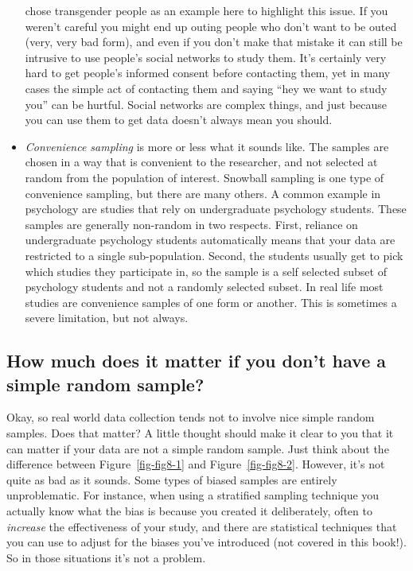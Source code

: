 \documentclass[
  a4paper,
]{book}
\begin{document}
\begin{itemize}
  chose transgender people as an example here to highlight this issue.
  If you weren't careful you might end up outing people who don't want
  to be outed (very, very bad form), and even if you don't make that
  mistake it can still be intrusive to use people's social networks to
  study them. It's certainly very hard to get people's informed consent
  before contacting them, yet in many cases the simple act of contacting
  them and saying ``hey we want to study you'' can be hurtful. Social
  networks are complex things, and just because you can use them to get
  data doesn't always mean you should.
\item
  \emph{Convenience sampling} is more or less what it sounds like. The
  samples are chosen in a way that is convenient to the researcher, and
  not selected at random from the population of interest. Snowball
  sampling is one type of convenience sampling, but there are many
  others. A common example in psychology are studies that rely on
  undergraduate psychology students. These samples are generally
  non-random in two respects. First, reliance on undergraduate
  psychology students automatically means that your data are restricted
  to a single sub-population. Second, the students usually get to pick
  which studies they participate in, so the sample is a self selected
  subset of psychology students and not a randomly selected subset. In
  real life most studies are convenience samples of one form or another.
  This is sometimes a severe limitation, but not always.
\end{itemize}

\hypertarget{how-much-does-it-matter-if-you-dont-have-a-simple-random-sample}{%
\subsection{How much does it matter if you don't have a simple random
sample?}\label{how-much-does-it-matter-if-you-dont-have-a-simple-random-sample}}

Okay, so real world data collection tends not to involve nice simple
random samples. Does that matter? A little thought should make it clear
to you that it can matter if your data are not a simple random sample.
Just think about the difference between Figure~\ref{fig-fig8-1} and
Figure~\ref{fig-fig8-2}. However, it's not quite as bad as it sounds.
Some types of biased samples are entirely unproblematic. For instance,
when using a stratified sampling technique you actually know what the
bias is because you created it deliberately, often to \emph{increase}
the effectiveness of your study, and there are statistical techniques
that you can use to adjust for the biases you've introduced (not covered
in this book!). So in those situations it's not a problem.
\end{document}
